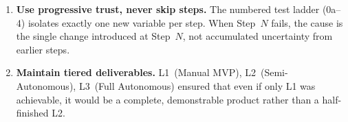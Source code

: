 \begin{enumerate}[leftmargin=1.5em]
  \item \textbf{Use progressive trust, never skip steps.}  The
        numbered test ladder (0a--4) isolates exactly one new variable
        per step.  When Step~$N$ fails, the cause is the single change
        introduced at Step~$N$, not accumulated uncertainty from
        earlier steps.

  \item \textbf{Maintain tiered deliverables.}  L1~(Manual MVP),
        L2~(Semi-Autonomous), L3~(Full Autonomous) ensured that even
        if only L1 was achievable, it would be a complete, demonstrable
        product rather than a half-finished L2.
\end{enumerate}
